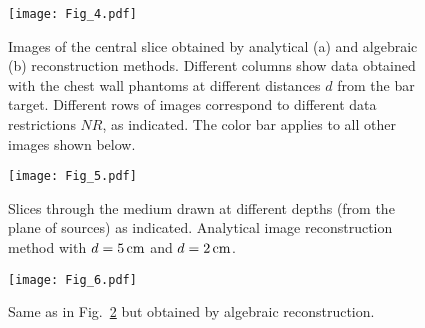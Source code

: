 \begin{figure}[htbp]
\begin{center}
\begin{minipage}[h]{1\textwidth}
\begin{center}
\texttt{[image: Fig\_4.pdf]}
\end{center}
\end{minipage}
\end{center}
\caption{\label{fig:central}
Images of the central slice obtained by analytical (a) and algebraic (b) reconstruction methods. Different columns show data obtained with the chest wall phantoms at different distances $d$ from the bar
target.  Different rows of images correspond to different data restrictions $NR$, as indicated.  The color bar applies to all other images shown below.}
\end{figure}

\begin{figure}[htbp]
\begin{center}
\begin{minipage}[h]{1\textwidth}
\begin{center}
\texttt{[image: Fig\_5.pdf]}
\end{center}
\end{minipage}
\end{center}
\caption{\label{fig:slices_analytical}
Slices through the medium drawn at different depths (from the plane of sources) as indicated. Analytical image reconstruction method with $d=5\,{\rm cm}$ and $d=2\,{\rm cm}$.}
\end{figure}

\begin{figure}[htbp]
\begin{center}
\begin{minipage}[h]{1\textwidth}
\begin{center}
\texttt{[image: Fig\_6.pdf]}
\end{center}
\end{minipage}
\end{center}
\caption{\label{fig:slices_numerical}
  Same as in Fig.~\ref{fig:slices_analytical} but obtained by algebraic reconstruction. }
\end{figure}
